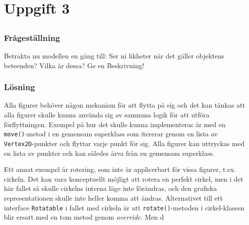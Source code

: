 %
%
%

\renewcommand{\thesubsection}{(\alph{subsection})}

\section{Uppgift 3}\label{sec:uppg3}

\subsection{}\label{sec:uppg3a}
\subsubsection*{Frågeställning}
Betrakta nu modellen en gång till: Ser ni likheter när det gäller objektens
beteenden? Vilka är dessa? Ge en Beskrivning!

\subsubsection*{Lösning}
Alla figurer behöver någon mekanism för att flytta på sig och det kan tänkas
att alla figurer skulle kunna använda sig av sammma logik för att utföra
förflyttningen. Exempel på hur det skulle kunna implementeras är med en
\texttt{move()}-metod i en gemensam superklass som itererar genom en lista av
\texttt{Vertex2D}-punkter och flyttar varje punkt för sig. Alla figurer kan
uttryckas med en lista av punkter och kan således ärva från en gemensam
superklass.
\par Ett annat exempel är rotering, som inte är applicerbart för vissa figurer,
t.ex. cirkeln. Det kan vara konceptuellt möjligt att rotera en perfekt cirkel,
men i det här fallet så skulle cirkelns interna läge inte förändras, och
den grafiska representationen skulle inte heller komma att ändras.
Alternativet till ett interface \texttt{Rotatable} i fallet med cirkeln är att
\texttt{rotate()}-metoden i cirkel-klassen blir ersatt med en tom metod genom 
\emph{override}. Men d


